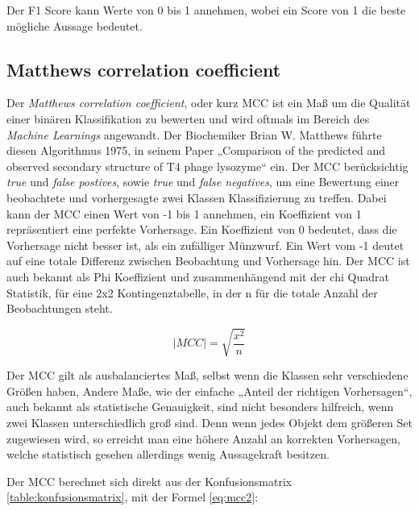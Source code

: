 Der F1 Score kann Werte von 0 bis 1 annehmen, wobei ein Score von 1 die beste mögliche Aussage bedeutet.


\subsection{Matthews correlation coefficient}

Der \emph{Matthews correlation coefficient}, oder kurz MCC ist ein Maß um die Qualität einer binären Klassifikation zu bewerten und wird oftmals im Bereich des \emph{Machine Learnings} angewandt. Der Biochemiker Brian W. Matthews führte diesen Algorithmus 1975, in seinem Paper „Comparison of the predicted and observed secondary structure of T4 phage lysozyme“\cite{Matthews.1975} ein. Der MCC berücksichtig \emph{true} und \emph{false postives}, sowie \emph{true} und \emph{false negatives}, um eine Bewertung einer beobachtete und vorhergesagte zwei Klassen Klassifizierung zu treffen. Dabei kann der MCC einen Wert von -1 bis 1 annehmen, ein Koeffizient von 1 repräsentiert eine perfekte Vorhersage. Ein Koeffizient von 0 bedeutet, dass die Vorhersage nicht besser ist, als ein zufälliger Münzwurf. Ein Wert vom -1 deutet auf eine totale Differenz zwischen Beobachtung und Vorhersage hin. Der MCC ist auch bekannt als Phi Koeffizient und zusammenhängend mit der chi Quadrat Statistik, für eine 2x2 Kontingenztabelle, in der n für die totale Anzahl der Beobachtungen steht.

\begin{equation}
    |MCC| = \sqrt{\frac{x^2}{n}}
    \label{eq:mcc}
\end{equation}

Der MCC gilt als ausbalanciertes Maß, selbst wenn die Klassen sehr verschiedene Größen haben, Andere Maße, wie der einfache „Anteil der richtigen Vorhersagen“, auch bekannt als statistische Genauigkeit, sind nicht besonders hilfreich, wenn zwei Klassen unterschiedlich groß sind. Denn wenn jedes Objekt dem größeren Set zugewiesen wird, so erreicht man eine höhere Anzahl an korrekten Vorhersagen, welche statistisch gesehen allerdings wenig Aussagekraft besitzen.

Der MCC berechnet sich direkt aus der Konfusionsmatrix \ref{table:konfusionsmatrix}, mit der Formel \ref{eq:mcc2}:

\begin{table}[]
    \centering
        \caption{Dargestellt ist die Konfusionsmatrix. tp = \emph{true positives}, fp = \emph{false postives}, tn \emph{truenegatives} und fn = \emph{false negatives}}
    \label{table:konfusionsmatrix}
\end{table}

